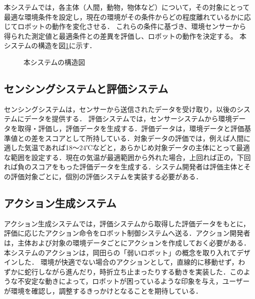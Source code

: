 \documentclass[paper=a4paper,jafontsize=9pt,head_space=15mm,gutter=20mm,
twocolumn,number_of_lines=49, line_length=26zw]{myuarticle}
\begin{document}
本システムでは，各主体（人間，動物，物体など）について，その対象にとって最適な環境条件を設定し，現在の環境がその条件からどの程度離れているかに応じてロボットの動作を変化させる．
これらの条件に基づき、環境センサーから得られた測定値と最適条件との差異を評価し、ロボットの動作を決定する。
本システムの構造を図\ref{fig:system-structure}に示す．

\fboxsep=0pt            %
\fboxrule=1pt            %
\begin{figure}[h]
  \centering
  \caption{本システムの構造図}
  \label{fig:system-structure}
\end{figure}

\subsection{センシングシステムと評価システム}
センシングシステムは，センサーから送信されたデータを受け取り，以後のシステムにデータを提供する．
評価システムでは，センサーシステムから環境データを取得・評価し，評価データを生成する．評価データは，環境データと評価基準値との差をスコアとして所持している．対象データの評価では，例えば人間に適した気温であれば18～24℃などと，あらかじめ対象データの主体にとって最適な範囲を設定する．現在の気温が最適範囲から外れた場合，上回れば正の，下回れば負のスコアをもった評価データを生成する．システム開発者は評価主体とその評価対象ごとに，個別の評価システムを実装する必要がある．

\subsection{アクション生成システム}
アクション生成システムでは，評価システムから取得した評価データをもとに，評価に応じたアクション命令をロボット制御システムへ送る．アクション開発者は，主体および対象の環境データごとにアクションを作成しておく必要がある．本システムのアクションは，岡田ら\cite{岡田-2017-弱いロボ}の「弱いロボット」の概念を取り入れてデザインした．
環境が快適でない場合のアクションとして，直線的に移動せず，わずかに蛇行しながら進んだり，時折立ち止まったりする動きを実装した．このような不安定な動きによって，ロボットが困っているような印象を与え，ユーザーが環境を確認し，調整するきっかけとなることを期待している．
\end{document}
